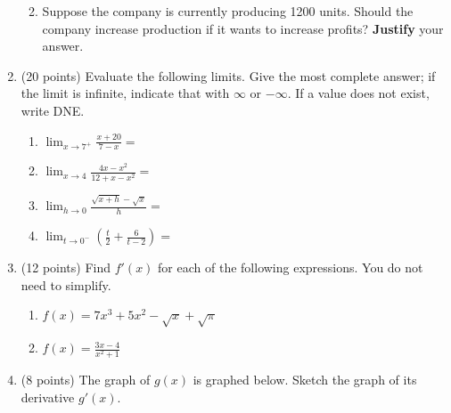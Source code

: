 \documentclass[12pt]{article}
\begin{document}
\begin{enumerate}
\begin{enumerate}
	\vspace{1in}

	\item Suppose the company is currently producing 1200 units. Should the company increase production if it wants to increase profits? \textbf{Justify} your answer.
\vfill
	\end{enumerate}
\newpage
\item (20 points) Evaluate the following limits. Give the most complete answer; if the limit is infinite, indicate that with $\infty$ or $-\infty.$ If a value does not exist, write DNE.\\
	\begin{enumerate}
	\item $\displaystyle{\lim_{x \to 7^+ }  \frac{x+20}{7-x}=}$
	\vfill
	\item $\displaystyle{\lim_{x  \to 4} \frac{4x-x^2}{12+x-x^2}=}$
	\vfill
	\item $\displaystyle{\lim_{h \to 0 } \frac{\sqrt{x+h} -\sqrt{x}}{h} =}$
	\vfill
	\item $\displaystyle{\lim_{t \to 0^-} \left(\frac{t}{2} + \frac{6}{t-2} \right)=}$
	\vfill
	\end{enumerate}
\newpage
\item (12 points) Find $f'(x)$ for each of the following expressions. You do not need to simplify.

	\begin{enumerate}

	\item $f(x)= 7x^3+5x^2-\sqrt{x}+\sqrt{\pi}$\\ \vfill

	\item $f(x)=\frac{3x-4}{x^2+1}$\\ \vfill

\end{enumerate}
\item (8 points) The graph of $g(x)$ is graphed below. Sketch the graph of its derivative $g'(x)$.

\begin{center}
 \end{center}


\end{enumerate}
\end{document}

